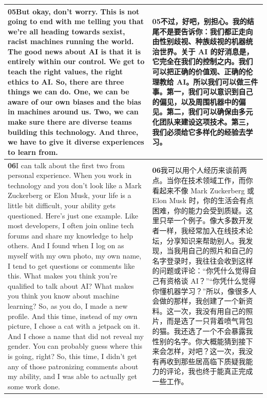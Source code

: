 \documentclass[UTF8,zihao=-4,fontset=fandol]{ctexart}
\newcommand{\TranscriptColumn}{\raggedright\arraybackslash\hyphenpenalty=10000\exhyphenpenalty=10000\sloppy}
\begin{document}
\begin{longtable}{>{\TranscriptColumn}p{} >{\TranscriptColumn}p{}}
\textbf{05}\quad But okay, don't worry. This is not going to end with me telling you that we're all heading towards sexist, racist machines running the world. The good news about AI is that it is entirely within our control. We get to teach the right values, the right ethics to AI. So, there are three things we can do. One, we can be aware of our own biases and the bias in machines around us. Two, we can make sure there are diverse teams building this technology. And three, we have to give it diverse experiences to learn from. & \textbf{05}\quad 不过，好吧，别担心。我的结尾不是要告诉你：我们都正走向由性别歧视、种族歧视的机器统治世界。关于 AI 的好消息是，它完全在我们的控制之内。我们可以把正确的价值观、正确的伦理教给 AI。所以我们可以做三件事。第一，我们可以意识到自己的偏见，以及周围机器中的偏见。第二，我们可以确保由多元化团队来建设这项技术。第三，我们必须给它多样化的经验去学习。 \\ \hline
\textbf{06}\quad I can talk about the first two from personal experience. When you work in technology and you don't look like a Mark Zuckerberg or Elon Musk, your life is a little bit difficult, your ability gets questioned. Here's just one example. Like most developers, I often join online tech forums and share my knowledge to help others. And I found when I log on as myself with my own photo, my own name, I tend to get questions or comments like this. What makes you think you're qualified to talk about AI? What makes you think you know about machine learning? So, as you do, I made a new profile. And this time, instead of my own picture, I chose a cat with a jetpack on it. And I chose a name that did not reveal my gender. You can probably guess where this is going, right? So, this time, I didn't get any of those patronizing comments about my ability, and I was able to actually get some work done. & \textbf{06}\quad 我可以用个人经历来谈前两点。当你在技术领域工作，而你看起来不像 Mark Zuckerberg 或 Elon Musk 时，你的生活会有点困难，你的能力会受到质疑。这里只举一个例子。像大多数开发者一样，我经常加入在线技术论坛，分享知识来帮助别人。我发现，当我用自己的照片和自己的名字登录时，我往往会收到这样的问题或评论：“你凭什么觉得自己有资格谈 AI？”“你凭什么觉得你懂机器学习？”所以，像很多人会做的那样，我创建了一个新资料。这一次，我没有用自己的照片，而是选了一只背着喷气背包的猫。我还选了一个不会暴露我性别的名字。你大概能猜到接下来会怎样，对吧？这一次，我没有再收到那些居高临下质疑我能力的评论，我也终于能真正完成一些工作。 \\ \hline

\end{longtable}
\end{document}
